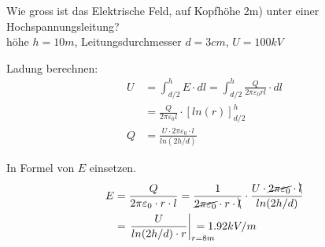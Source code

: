 
\begin{karte}{Wie gross ist das Elektrische Feld, auf Kopfhöhe 2m) unter einer Hochspannungsleitung?\\
	\small höhe $h = 10m$, Leitungsdurchmesser $d = 3cm$, $U=100kV$}
	\small
	\begin{compactenum}
		\item Ladung berechnen:
		\begin{align*}
			U &= \int_{d/2}^{h} E \cdot dl = \int_{d/2}^{h} \frac{Q}{2 \pi \varepsilon_0 r l} \cdot dl  \\
			&=\frac{Q}{2 \pi \varepsilon_0 l} \cdot \left[ln(r)\right]_{d/2}^{h}\\
			Q & = \frac{U \cdot 2\pi \varepsilon_0\cdot l}{ln(2h/d)}
		\end{align*}
		\item In Formel von $E$ einsetzen. 
		\renewcommand\CancelColor{\color{red}}
		\begin{align*}	
			E &= \frac{Q}{2\pi \varepsilon_0\cdot r \cdot l} =
			\frac{1}{\cancel{2\pi \varepsilon_0}\cdot r \cdot \bcancel{l}} \cdot
			\frac{U \cdot \cancel{2\pi \varepsilon_0}\cdot \bcancel{l}}{ln(2h/d)}\\
			& = \left.\frac{U}{ln(2h/d)\cdot r}\right|_{r=8m} \hspace{-7mm} = 1.92kV/m
		\end{align*}
	\end{compactenum}
\end{karte}